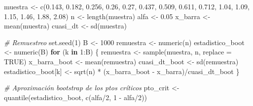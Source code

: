 \documentclass[
]{book}
\newenvironment{Shaded}{\begin{snugshade}}{\end{snugshade}}
\newcommand{\AttributeTok}[1]{\textcolor[rgb]{0.77,0.63,0.00}{#1}}
\newcommand{\CommentTok}[1]{\textcolor[rgb]{0.56,0.35,0.01}{\textit{#1}}}
\newcommand{\ConstantTok}[1]{\textcolor[rgb]{0.00,0.00,0.00}{#1}}
\newcommand{\ControlFlowTok}[1]{\textcolor[rgb]{0.13,0.29,0.53}{\textbf{#1}}}
\newcommand{\DecValTok}[1]{\textcolor[rgb]{0.00,0.00,0.81}{#1}}
\newcommand{\FloatTok}[1]{\textcolor[rgb]{0.00,0.00,0.81}{#1}}
\newcommand{\FunctionTok}[1]{\textcolor[rgb]{0.00,0.00,0.00}{#1}}
\newcommand{\NormalTok}[1]{#1}
\newcommand{\OtherTok}[1]{\textcolor[rgb]{0.56,0.35,0.01}{#1}}
\newcommand{\SpecialCharTok}[1]{\textcolor[rgb]{0.00,0.00,0.00}{#1}}
\theoremstyle{break}
\theoremstyle{definition}
\theoremstyle{definition}
\theoremstyle{definition}
\theoremstyle{definition}
\theoremstyle{remark}
\begin{document}
\begin{Shaded}
\begin{Highlighting}[]
\NormalTok{muestra }\OtherTok{\textless{}{-}} \FunctionTok{c}\NormalTok{(}\FloatTok{0.143}\NormalTok{, }\FloatTok{0.182}\NormalTok{, }\FloatTok{0.256}\NormalTok{, }\FloatTok{0.26}\NormalTok{, }\FloatTok{0.27}\NormalTok{, }\FloatTok{0.437}\NormalTok{, }\FloatTok{0.509}\NormalTok{, }
             \FloatTok{0.611}\NormalTok{, }\FloatTok{0.712}\NormalTok{, }\FloatTok{1.04}\NormalTok{, }\FloatTok{1.09}\NormalTok{, }\FloatTok{1.15}\NormalTok{, }\FloatTok{1.46}\NormalTok{, }\FloatTok{1.88}\NormalTok{, }\FloatTok{2.08}\NormalTok{)}
\NormalTok{n }\OtherTok{\textless{}{-}} \FunctionTok{length}\NormalTok{(muestra)}
\NormalTok{alfa }\OtherTok{\textless{}{-}} \FloatTok{0.05}
\NormalTok{x\_barra }\OtherTok{\textless{}{-}} \FunctionTok{mean}\NormalTok{(muestra)}
\NormalTok{cuasi\_dt }\OtherTok{\textless{}{-}} \FunctionTok{sd}\NormalTok{(muestra)}

\CommentTok{\# Remuestreo}
\FunctionTok{set.seed}\NormalTok{(}\DecValTok{1}\NormalTok{)}
\NormalTok{B }\OtherTok{\textless{}{-}} \DecValTok{1000}
\NormalTok{remuestra }\OtherTok{\textless{}{-}} \FunctionTok{numeric}\NormalTok{(n)}
\NormalTok{estadistico\_boot }\OtherTok{\textless{}{-}} \FunctionTok{numeric}\NormalTok{(B)}
\ControlFlowTok{for}\NormalTok{ (k }\ControlFlowTok{in} \DecValTok{1}\SpecialCharTok{:}\NormalTok{B) \{}
\NormalTok{  remuestra }\OtherTok{\textless{}{-}} \FunctionTok{sample}\NormalTok{(muestra, n, }\AttributeTok{replace =} \ConstantTok{TRUE}\NormalTok{)}
\NormalTok{  x\_barra\_boot }\OtherTok{\textless{}{-}} \FunctionTok{mean}\NormalTok{(remuestra)}
\NormalTok{  cuasi\_dt\_boot }\OtherTok{\textless{}{-}} \FunctionTok{sd}\NormalTok{(remuestra)}
\NormalTok{  estadistico\_boot[k] }\OtherTok{\textless{}{-}} \FunctionTok{sqrt}\NormalTok{(n) }\SpecialCharTok{*}\NormalTok{ (x\_barra\_boot }\SpecialCharTok{{-}}\NormalTok{ x\_barra)}\SpecialCharTok{/}\NormalTok{cuasi\_dt\_boot}
\NormalTok{\}}

\CommentTok{\# Aproximación bootstrap de los ptos críticos}
\NormalTok{pto\_crit }\OtherTok{\textless{}{-}} \FunctionTok{quantile}\NormalTok{(estadistico\_boot, }\FunctionTok{c}\NormalTok{(alfa}\SpecialCharTok{/}\DecValTok{2}\NormalTok{, }\DecValTok{1} \SpecialCharTok{{-}}\NormalTok{ alfa}\SpecialCharTok{/}\DecValTok{2}\NormalTok{))}


\end{Highlighting}
\end{Shaded}
\end{document}
